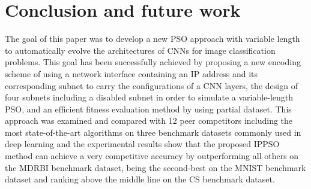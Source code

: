 \documentclass[conference]{IEEEtran}
\begin{document}
%






\section{Conclusion and future work}\label{sec:Conclusion}

The goal of this paper was to develop a new PSO approach with variable length to automatically evolve the architectures of CNNs for image classification problems. This goal has been successfully achieved by proposing a new encoding scheme of using a network interface containing an IP address and its corresponding subnet to carry the configurations of a CNN layers, the design of four subnets including a disabled subnet in order to simulate a variable-length PSO, and an efficient fitness evaluation method by using partial dataset. This approach was examined and compared with 12 peer competitors including the most state-of-the-art algorithms on three benchmark datasets commonly used in deep learning and the experimental results show that the proposed IPPSO method can achieve a very competitive accuracy by outperforming all others on the MDRBI benchmark dataset, being the second-best on the MNIST benchmark dataset and ranking above the middle line on the CS benchmark dataset. 
\end{document}
